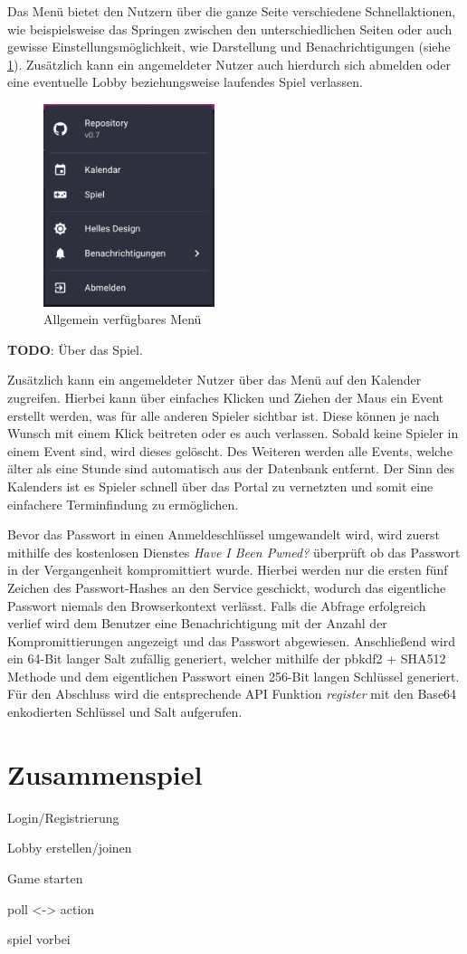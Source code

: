 Das Menü bietet den Nutzern über die ganze Seite verschiedene Schnellaktionen, wie beispielsweise das Springen zwischen den unterschiedlichen Seiten oder auch gewisse Einstellungsmöglichkeit, wie Darstellung und Benachrichtigungen (siehe \cref{fig:menu}). Zusätzlich kann ein angemeldeter Nutzer auch hierdurch sich abmelden oder eine eventuelle Lobby beziehungsweise laufendes Spiel verlassen.

\begin{figure}
	\includegraphics[width=5cm]{images/menu.png}
	\caption{Allgemein verfügbares Menü}
	\label{fig:menu}
\end{figure}

\textbf{TODO}: Über das Spiel.

Zusätzlich kann ein angemeldeter Nutzer über das Menü auf den Kalender zugreifen. Hierbei kann über einfaches Klicken und Ziehen der Maus ein Event erstellt werden, was für alle anderen Spieler sichtbar ist. Diese können je nach Wunsch mit einem Klick beitreten oder es auch verlassen. Sobald keine Spieler in einem Event sind, wird dieses gelöscht. Des Weiteren werden alle Events, welche älter als eine Stunde sind automatisch aus der Datenbank entfernt. Der Sinn des Kalenders ist es Spieler schnell über das Portal zu vernetzten und somit eine einfachere Terminfindung zu ermöglichen.

\label{sec:frontend-registrierung}
Bevor das Passwort in einen Anmeldeschlüssel umgewandelt wird, wird zuerst mithilfe des kostenlosen Dienstes \textit{Have I Been Pwned?} überprüft ob das Passwort in der Vergangenheit kompromittiert wurde. Hierbei werden nur die ersten fünf Zeichen des Passwort-Hashes an den Service geschickt, wodurch das eigentliche Passwort niemals den Browserkontext verlässt. Falls die Abfrage erfolgreich verlief wird dem Benutzer eine Benachrichtigung mit der Anzahl der Kompromittierungen angezeigt und das Passwort abgewiesen. Anschließend wird ein 64-Bit langer Salt zufällig generiert, welcher mithilfe der \gls{pbkdf2} + SHA512 Methode und dem eigentlichen Passwort einen 256-Bit langen Schlüssel generiert. Für den Abschluss wird die entsprechende API Funktion \textit{register} mit den Base64 enkodierten Schlüssel und Salt aufgerufen.

\section{Zusammenspiel}

Login/Registrierung

Lobby erstellen/joinen

Game starten

poll <-> action

spiel vorbei